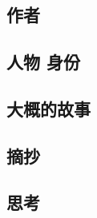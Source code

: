 \documentclass[a4paper]{ctexart}
\begin{document}
\newpage
\section{}
\subsection{作者}

\subsection{人物 身份}

\subsection{大概的故事}

\subsection{摘抄}

\subsection{思考}	
	
	
\end{document}

